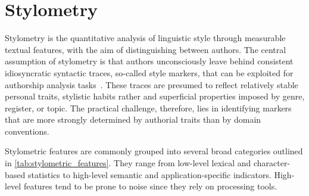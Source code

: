 \section{Stylometry}

    Stylometry is the quantitative analysis of linguistic style through measurable textual features, with the aim of distinguishing between authors.
The central assumption of stylometry is that authors unconsciously leave behind consistent idiosyncratic syntactic traces, so-called style markers, that can be exploited for authorship analysis tasks~\citep{neal_surveying_2018,bischoff_importance_2020}. 
These traces are presumed to reflect relatively stable personal traits, stylistic habits rather and superficial properties imposed by genre, register, or topic. 
The practical challenge, therefore, lies in identifying markers that are more strongly determined by authorial traits than by domain conventions.

Stylometric features are commonly grouped into several broad categories outlined in \autoref{tab:stylometric_features}. 
They range from low-level lexical and character-based statistics to high-level semantic and application-specific indicators.
High-level features tend to be prone to noise since they rely on processing tools.



